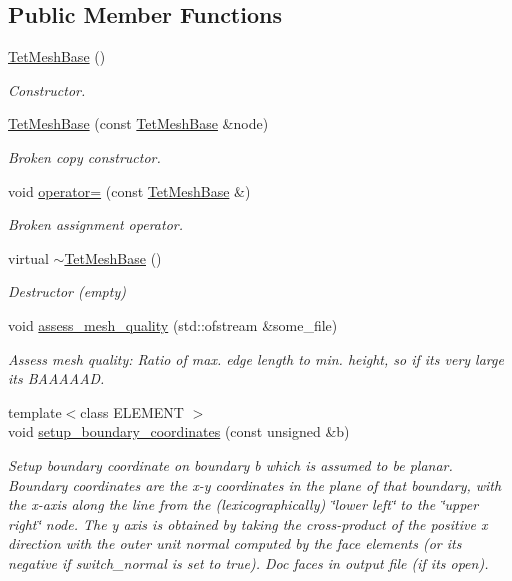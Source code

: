 \subsection*{Public Member Functions}
\begin{DoxyCompactItemize}
\item 
\hyperlink{classoomph_1_1TetMeshBase_abf0883a1f6964480ddabf5867b3b2a55}{Tet\+Mesh\+Base} ()
\begin{DoxyCompactList}\small\item\em Constructor. \end{DoxyCompactList}\item 
\hyperlink{classoomph_1_1TetMeshBase_af324e7f2cc2f1ae8efd510786331684f}{Tet\+Mesh\+Base} (const \hyperlink{classoomph_1_1TetMeshBase}{Tet\+Mesh\+Base} \&node)
\begin{DoxyCompactList}\small\item\em Broken copy constructor. \end{DoxyCompactList}\item 
void \hyperlink{classoomph_1_1TetMeshBase_ac3ced0bb4e8a392f99f45c65d5cb2897}{operator=} (const \hyperlink{classoomph_1_1TetMeshBase}{Tet\+Mesh\+Base} \&)
\begin{DoxyCompactList}\small\item\em Broken assignment operator. \end{DoxyCompactList}\item 
virtual \hyperlink{classoomph_1_1TetMeshBase_a03628ca8bccf0700d39728ba266dae3e}{$\sim$\+Tet\+Mesh\+Base} ()
\begin{DoxyCompactList}\small\item\em Destructor (empty) \end{DoxyCompactList}\item 
void \hyperlink{classoomph_1_1TetMeshBase_aa8b4e18d5f358a5bc64151861d990ca3}{assess\+\_\+mesh\+\_\+quality} (std\+::ofstream \&some\+\_\+file)
\begin{DoxyCompactList}\small\item\em Assess mesh quality\+: Ratio of max. edge length to min. height, so if it\textquotesingle{}s very large it\textquotesingle{}s B\+A\+A\+A\+A\+AD. \end{DoxyCompactList}\item 
{\footnotesize template$<$class E\+L\+E\+M\+E\+NT $>$ }\\void \hyperlink{classoomph_1_1TetMeshBase_a7a1c53094acf2416a17867cc3b126cfe}{setup\+\_\+boundary\+\_\+coordinates} (const unsigned \&b)
\begin{DoxyCompactList}\small\item\em Setup boundary coordinate on boundary b which is assumed to be planar. Boundary coordinates are the x-\/y coordinates in the plane of that boundary, with the x-\/axis along the line from the (lexicographically) \char`\"{}lower left\char`\"{} to the \char`\"{}upper right\char`\"{} node. The y axis is obtained by taking the cross-\/product of the positive x direction with the outer unit normal computed by the face elements (or its negative if switch\+\_\+normal is set to true). Doc faces in output file (if it\textquotesingle{}s open). \end{DoxyCompactList}\item 

\end{DoxyCompactItemize}
